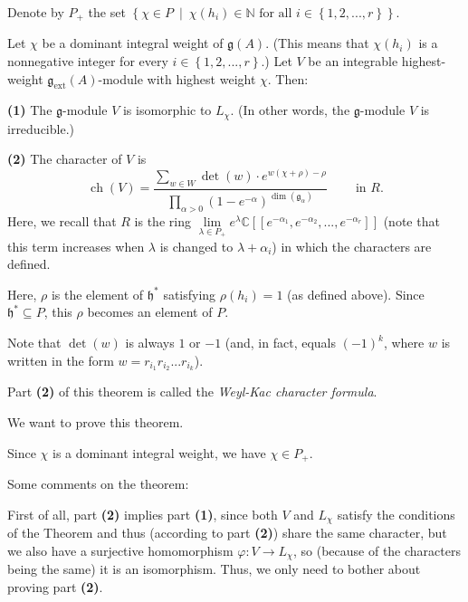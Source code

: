 \documentclass[etingof-lie.tex]{subfiles}
\begin{document}
\begin{theorem}
[Kac]\label{thm.weylkac.weylkac}Denote by $P_{+}$ the set $\left\{  \chi\in
P\ \mid\ \chi\left(  h_{i}\right)  \in\mathbb{N}\text{ for all }i\in\left\{
1,2,...,r\right\}  \right\}  $.

Let $\chi$ be a dominant integral weight of $\mathfrak{g}\left(  A\right)  $.
(This means that $\chi\left(  h_{i}\right)  $ is a nonnegative integer for
every $i\in\left\{  1,2,...,r\right\}  $.) Let $V$ be an integrable
highest-weight $\mathfrak{g}_{\operatorname*{ext}}\left(  A\right)  $-module
with highest weight $\chi$. Then:

\textbf{(1)} The $\mathfrak{g}$-module $V$ is isomorphic to $L_{\chi}$. (In
other words, the $\mathfrak{g}$-module $V$ is irreducible.)

\textbf{(2)} The character of $V$ is%
\[
\operatorname*{ch}\left(  V\right)  =\dfrac{\sum\limits_{w\in W}\det\left(
w\right)  \cdot e^{w\left(  \chi+\rho\right)  -\rho}}{\prod\limits_{\alpha
>0}\left(  1-e^{-\alpha}\right)  ^{\dim\left(  \mathfrak{g}_{\alpha}\right)
}}\ \ \ \ \ \ \ \ \ \ \text{in }R.
\]
Here, we recall that $R$ is the ring $\lim\limits_{\lambda\in P_{+}}%
e^{\lambda}\mathbb{C}\left[  \left[  e^{-\alpha_{1}},e^{-\alpha_{2}%
},...,e^{-\alpha_{r}}\right]  \right]  $ (note that this term increases when
$\lambda$ is changed to $\lambda+\alpha_{i}$) in which the characters are defined.

Here, $\rho$ is the element of $\mathfrak{h}^{\ast}$ satisfying $\rho\left(
h_{i}\right)  =1$ (as defined above). Since $\mathfrak{h}^{\ast}\subseteq P$,
this $\rho$ becomes an element of $P$.

Note that $\det\left(  w\right)  $ is always $1$ or $-1$ (and, in fact, equals
$\left(  -1\right)  ^{k}$, where $w$ is written in the form $w=r_{i_{1}%
}r_{i_{2}}...r_{i_{k}}$).
\end{theorem}

Part \textbf{(2)} of this theorem is called the \textit{Weyl-Kac character
formula}.

We want to prove this theorem.

Since $\chi$ is a dominant integral weight, we have $\chi\in P_{+}$.

Some comments on the theorem:

First of all, part \textbf{(2)} implies part \textbf{(1)}, since both $V$ and
$L_{\chi}$ satisfy the conditions of the Theorem and thus (according to part
\textbf{(2)}) share the same character, but we also have a surjective
homomorphism $\varphi:V\rightarrow L_{\chi}$, so (because of the characters
being the same) it is an isomorphism. Thus, we only need to bother about
proving part \textbf{(2)}.
\end{document}

